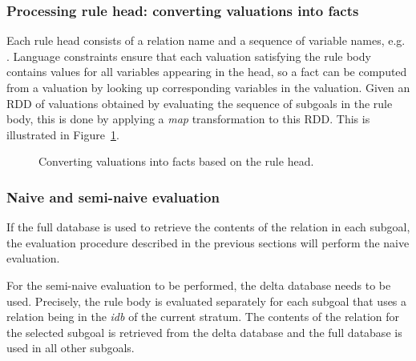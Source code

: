 \subsubsection{Processing rule head: converting valuations into facts}

Each rule head consists of a relation name and a sequence of variable names, e.g. . Language constraints ensure that each valuation satisfying the rule body contains values for all variables appearing in the head, so a fact can be computed from a valuation by looking up corresponding variables in the valuation. Given an RDD of valuations obtained by evaluating the sequence of subgoals in the rule body, this is done by applying a \emph{map} transformation to this RDD. This is illustrated in Figure~\ref{graphevalrulehead}.


\begin{figure}[!ht]
\centering
{}
\caption{Converting valuations into facts based on the rule head.}\label{graphevalrulehead}
\end{figure}

\subsubsection{Naive and semi-naive evaluation}
If the full database is used to retrieve the contents of the relation in each subgoal, the evaluation procedure described in the previous sections will perform the naive evaluation.

For the semi-naive evaluation to be performed, the delta database needs to be used. Precisely, the rule body is evaluated separately for each subgoal that uses a relation being in the \emph{idb} of the current stratum. The contents of the relation for the selected subgoal is retrieved from the delta database and the full database is used in all other subgoals.

